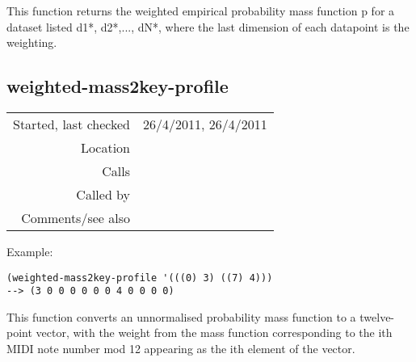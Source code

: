 \noindent This function returns the weighted empirical
probability mass function p for a dataset listed
d1*, d2*,..., dN*, where the last dimension of each
datapoint is the weighting.


\subsection*{weighted-mass2key-profile}\label{fun:weighted-mass2key-profile}

\vspace{0.3cm}
\begin{tabular}{r|p{8cm}}
Started, last checked & 26/4/2011, 26/4/2011 \\
Location & \nameref{sec:keyscape} \\
Calls & \\
Called by & \nameref{fun:key-correlations} \\
Comments/see also & 
\end{tabular}

\vspace{0.5cm}
\noindent Example:
\begin{verbatim}
(weighted-mass2key-profile '(((0) 3) ((7) 4)))
--> (3 0 0 0 0 0 0 4 0 0 0 0)
\end{verbatim}

\noindent This function converts an unnormalised
probability mass function to a twelve-point vector,
with the weight from the mass function corresponding
to the ith MIDI note number mod 12 appearing as the
ith element of the vector.









